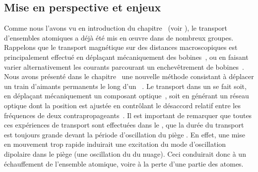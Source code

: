 \subsection{Mise en perspective et enjeux}
Comme nous l'avons vu en introduction du chapitre~ (voir ), le transport d'ensembles atomiques \ufs a déjà été mis en \oe uvre dans de nombreux groupes. Rappelons que le transport magnétique sur des distances macroscopiques est principalement effectué en déplaçant mécaniquement des bobines~\cite{LHW03,NSH05}, ou en faisant varier alternativement les courants parcourant un enchevêtrement de bobines~\cite{GBH01}. Nous avons présenté dans le chapitre~ une nouvelle méthode consistant à déplacer un train d'aimants permanents le long d'un \gm~\cite{LRW06}. 
Le transport dans un \pd se fait soit, en déplaçant mécaniquement un composant optique~\cite{GCL02}, soit en générant un réseau optique \ud dont la position est ajustée en contrôlant le désaccord relatif entre les fréquences de deux \fls contrapropageants~\cite{KAS01,STW06}.
Il est important de remarquer que toutes ces expériences de transport sont effectuées dans le , \cad que la durée du transport est toujours grande devant la période d'oscillation du piège%
. 
En effet, une mise en mouvement trop rapide induirait une excitation du mode d'oscillation dipolaire dans le piège (une oscillation du \cdm du nuage). Ceci conduirait donc à un échauffement de l'ensemble atomique, voire à la perte d'une partie des atomes. 



